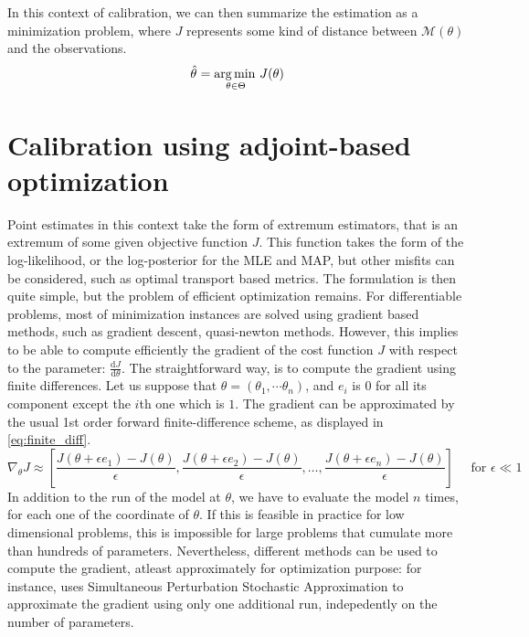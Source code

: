 \documentclass[../../Main_ManuscritThese.tex]{subfiles}
\begin{document}
In this context of calibration, we can then summarize the estimation as a minimization problem, where $J$ represents some kind of distance between $\mathcal{M}(\theta)$ and the observations.
\begin{equation}
  \hat{\theta}_{\mathrm{}} = \operatorname*{arg\,min \,}_{\theta\in \Theta} J(\theta)
\end{equation}

\section{Calibration using adjoint-based optimization}
\label{sec:calibration_adjoint_optimization}
Point estimates in this context take the form of extremum estimators, that is an extremum of some given objective function $J$. This function takes the form of the log-likelihood, or the log-posterior for the MLE and MAP, but other misfits can be considered, such as optimal transport based metrics. The formulation is then quite simple, but the problem of efficient optimization remains. For differentiable problems, most of minimization instances are solved using gradient based methods, such as gradient descent, quasi-newton methods.
However, this implies to be able to compute efficiently the gradient of the cost function $J$ with respect to the parameter: $\frac{\mathrm{d}J}{\mathrm{d}\theta}$. The straightforward way, is to compute the gradient using finite differences. Let us suppose that $\theta = (\theta_1,\cdots \theta_n)$, and $e_i$ is 0 for all its component except the $i$th one which is $1$. The gradient can be approximated by the usual 1st order forward finite-difference scheme, as displayed in \cref{eq:finite_diff}.
\begin{equation}
  \label{eq:finite_diff}
  \nabla_{\theta} J  \approx \left[\frac{J(\theta + \epsilon e_1) - J(\theta)}{\epsilon}, \frac{J(\theta + \epsilon e_2) - J(\theta)}{ \epsilon},\dots, \frac{J(\theta + \epsilon e_n)- J(\theta)}{\epsilon} \right] \quad \text{ for } \epsilon \ll 1
\end{equation}
In addition to the run of the model at $\theta$, we have to evaluate the model $n$ times, for each one of the coordinate of $\theta$. If this is feasible in practice for low dimensional problems, this is impossible for large problems that cumulate more than hundreds of parameters. Nevertheless, different methods can be used to compute the gradient, atleast approximately for optimization purpose: for instance, \cite{boutet_estimation_2015} uses Simultaneous Perturbation Stochastic Approximation to approximate the gradient using only one additional run, indepedently on the number of parameters.
\end{document}
